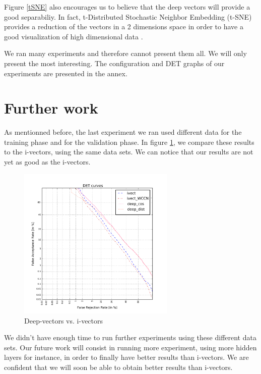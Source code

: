 \documentclass[conference]{IEEEtran}
\begin{document}
Figure \ref{tSNE} also encourages us to believe that the deep vectors will provide a good separabiliy. In fact, t-Distributed Stochastic Neighbor Embedding (t-SNE) provides a reduction of the vectors in a 2 dimensions space in order to have a good visualization of high dimensional data \cite{ictdbid:2777}.

We ran many experiments and therefore cannot present them all. We will only present the most interesting. The configuration and DET graphs of our experiments are presented in the annex.

\section{Further work}

As mentionned before, the last experiment we ran used different data for the training phase and for the validation phase. In figure \ref{exp7ivectors}, we compare these results to the i-vectors, using the same data sets. We can notice that our results are not yet as good as the i-vectors.


\begin{figure}[!h]
    \centering
    \includegraphics[width=7.5cm]{../scores/exp7_et_gabi.pdf}
    \caption{Deep-vectors vs. i-vectors}
	\label{exp7ivectors}
\end{figure}

We didn't have enough time to run further experiments using these different data sets. Our future work will consist in running more experiment, using more hidden layers for instance, in order to finally have better results than i-vectors. We are confident that we will soon be able to obtain better results than i-vectors.


\newpage
\printbibliography

\newpage
\end{document}
